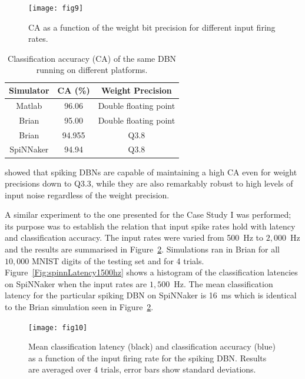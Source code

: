 \documentclass{frontiersENG} %
\begin{document}
\begin{figure}[hbt!]
	\centering
	\texttt{[image: fig9]}
	\caption{CA as a function of the weight bit precision for different input firing rates.}
	\label{Fig:brianCAfiringrate}
\end{figure} 


\begin{table}[h]
	\caption{Classification accuracy (CA) of the same DBN running on different platforms.}
	\begin{center}
    \bgroup
    \def\arraystretch{1.4}
		\begin{tabular} {c c c}
			Simulator & CA (\%) & Weight Precision \\
			\hline
			Matlab & 96.06 & Double floating point\\
			Brian & 95.00 & Double floating point\\
			Brian & 94.955 & Q3.8\\
			SpiNNaker & 94.94 & Q3.8\\
		\end{tabular}
    \egroup
		\label{tab:casimulators}
	\end{center}
\end{table}

\citet{stromatias2015robustness} showed that spiking DBNs are capable of maintaining a high CA even for weight precisions down to Q3.3, while they are also remarkably robust to high levels of input noise regardless of the weight precision. 

A similar experiment to the one presented for the Case Study I was performed; its purpose was to establish the relation that input spike rates hold with latency and classification accuracy.
The input rates were varied from 500~Hz to $2,000$~Hz and the results are summarised in Figure~\ref{Fig:brianLatency}. Simulations ran in Brian for all $10,000$ MNIST digits of the testing set and for 4 trials. Figure~\ref{Fig:spinnLatency1500hz} shows a histogram of the classification latencies on SpiNNaker when the input rates are $1,500$~Hz. The mean classification latency for the particular spiking DBN on SpiNNaker is 16~ms which is identical to the Brian simulation seen in Figure~\ref{Fig:brianLatency}.


\begin{figure}[hbt!]
	\centering
	\texttt{[image: fig10]}
	\caption{Mean classification latency (black) and classification accuracy (blue) as a function of the input firing rate for the spiking DBN. Results are averaged over 4 trials, error bars show standard deviations.}
	\label{Fig:brianLatency}
\end{figure} 
\end{document}
